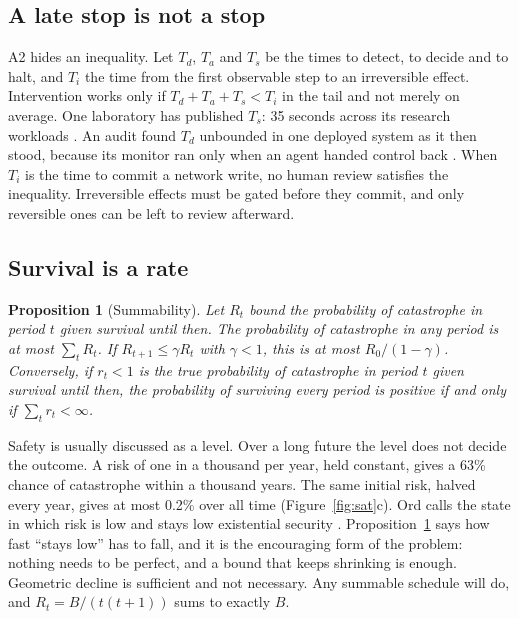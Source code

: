 \documentclass[10pt,twocolumn,letterpaper]{article}
\newtheorem{proposition}{Proposition}
\theoremstyle{definition}
\begin{document}
\subsection{A late stop is not a stop}

A2 hides an inequality. Let $T_{d}$, $T_{a}$ and $T_{s}$ be the times to detect, to decide and to halt, and $T_{i}$ the time from the first observable step to an irreversible effect. Intervention works only if $T_{d}+T_{a}+T_{s}<T_{i}$ in the tail and not merely on average. One laboratory has published $T_{s}$: 35 seconds across its research workloads \cite{controlroom}. An audit found $T_{d}$ unbounded in one deployed system as it then stood, because its monitor ran only when an agent handed control back \cite{metraudit}. When $T_{i}$ is the time to commit a network write, no human review satisfies the inequality. Irreversible effects must be gated before they commit, and only reversible ones can be left to review afterward.

\subsection{Survival is a rate}

\begin{proposition}[Summability]
\label{prop:sum}
Let $R_{t}$ bound the probability of catastrophe in period $t$ given survival until then. The probability of catastrophe in any period is at most $\sum_{t}R_{t}$. If $R_{t+1}\le\gamma R_{t}$ with $\gamma<1$, this is at most $R_{0}/(1-\gamma)$. Conversely, if $r_{t}<1$ is the true probability of catastrophe in period $t$ given survival until then, the probability of surviving every period is positive if and only if $\sum_{t}r_{t}<\infty$.
\end{proposition}

Safety is usually discussed as a level. Over a long future the level does not decide the outcome. A risk of one in a thousand per year, held constant, gives a 63\% chance of catastrophe within a thousand years. The same initial risk, halved every year, gives at most 0.2\% over all time (Figure~\ref{fig:sat}c). Ord calls the state in which risk is low and stays low existential security \cite{ord}. Proposition~\ref{prop:sum} says how fast ``stays low'' has to fall, and it is the encouraging form of the problem: nothing needs to be perfect, and a bound that keeps shrinking is enough. Geometric decline is sufficient and not necessary. Any summable schedule will do, and $R_{t}=B/(t(t+1))$ sums to exactly $B$.
\end{document}
